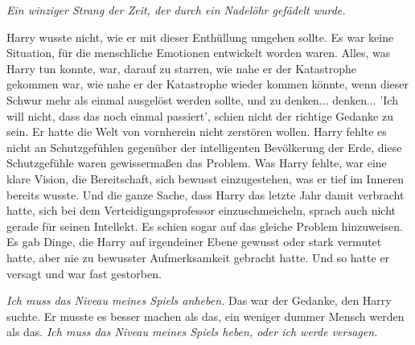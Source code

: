 \emph{Ein winziger Strang der Zeit, der durch ein Nadelöhr gefädelt wurde. }

Harry wusste nicht, wie er mit dieser Enthüllung umgehen sollte. Es war keine
Situation, für die menschliche Emotionen entwickelt worden waren. Alles, was
Harry tun konnte, war, darauf zu starren, wie nahe er der Katastrophe gekommen
war, wie nahe er der Katastrophe wieder kommen könnte, wenn dieser Schwur mehr
als einmal ausgelöst werden sollte, und zu denken... denken... 'Ich will nicht,
dass das noch einmal passiert', schien nicht der richtige Gedanke zu sein. Er
hatte die Welt von vornherein nicht zerstören wollen. Harry fehlte es nicht an
Schutzgefühlen gegenüber der intelligenten Bevölkerung der Erde, diese
Schutzgefühle waren gewissermaßen das Problem. Was Harry fehlte, war eine klare
Vision, die Bereitschaft, sich bewusst einzugestehen, was er tief im Inneren
bereits wusste. Und die ganze Sache, dass Harry das letzte Jahr damit verbracht
hatte, sich bei dem Verteidigungsprofessor einzuschmeicheln, sprach auch nicht
gerade für seinen Intellekt. Es schien sogar auf das gleiche Problem
hinzuweisen. Es gab Dinge, die Harry auf irgendeiner Ebene gewusst oder stark
vermutet hatte, aber nie zu bewusster Aufmerksamkeit gebracht hatte. Und so
hatte er versagt und war fast gestorben.

\emph{Ich muss das Niveau meines Spiels anheben. }
Das war der Gedanke, den Harry suchte. Er musste es besser machen als das, ein
weniger dummer Mensch werden als das.
\emph{Ich muss das Niveau meines Spiels heben, oder ich werde versagen.}

